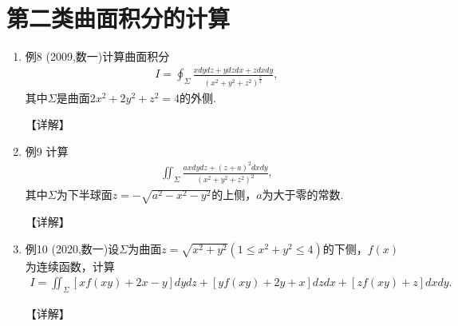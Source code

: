 \documentclass[12pt, a4paper, oneside, UTF8]{ctexbook}
\begin{document}
\section{第二类曲面积分的计算}

\begin{remark}[方法]
\end{remark}

\begin{enumerate}[label=\arabic*.,start=8]
    \item 例8 (2009,数一)计算曲面积分
    \begin{align*}
    I=\oint_{\Sigma}\frac{xdydz+ydzdx+zdxdy}{(x^2+y^2+z^2)^{\frac{3}{2}}},
    \end{align*}
    其中$\Sigma$是曲面$2x^2+2y^2+z^2=4$的外侧.
    
    \begin{solution}
    【详解】
    \end{solution}
    
    \item 例9 计算
    \begin{align*}
    \iint_{\Sigma}\frac{axdydz+(z+a)^2dxdy}{(x^2+y^2+z^2)^2},
    \end{align*}
    其中$\Sigma$为下半球面$z=-\sqrt{a^2-x^2-y^2}$的上侧，$a$为大于零的常数.
    
    \begin{solution}
    【详解】
    \end{solution}
    
    \item 例10 (2020,数一)设$\Sigma$为曲面$z=\sqrt{x^2+y^2}(1\leq x^2+y^2\leq 4)$的下侧，$f(x)$为连续函数，计算
    \begin{align*}
    I=\iint_{\Sigma}[xf(xy)+2x-y]dydz+[yf(xy)+2y+x]dzdx+[zf(xy)+z]dxdy.
    \end{align*}
    
    \begin{solution}
    【详解】
    \end{solution}
\end{enumerate}

\ifx\allfiles\undefined
\end{document}
